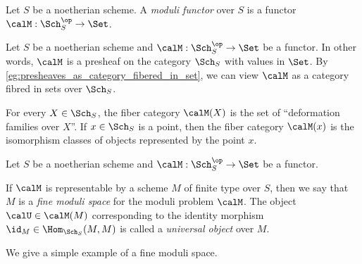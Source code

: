     \begin{definition}\label{def:moduli_functor}
        Let \(S\) be a noetherian scheme.
        A \emph{moduli functor} over \(S\) is a functor \(\calM: \Sch_{S}^{\op} \to \Set\).
    \end{definition}

    \begin{remark}\label{rmk:moduli_functor_as_presheaf_and_fibred_category}
        Let \(S\) be a noetherian scheme and \(\calM: \Sch_{S}^{\op} \to \Set\) be a functor.
        In other words, \(\calM\) is a presheaf on the category \(\Sch_{S}\) with values in \(\Set\).
        By \cref{eg:presheaves_as_category_fibered_in_set}, we can view \(\calM\) as a category  fibred in sets over \(\Sch_{S}\).

        For every \(X \in \Sch_{S}\), the fiber category \(\calM(X)\) is the set of ``deformation families over \(X\)''.
        If \(x \in \Sch_{S}\) is a point, then the fiber category \(\calM(x)\) is the isomorphism classes of objects represented by the point \(x\).
    \end{remark}



    \begin{definition}\label{def:fine_moduli_space}
        Let \(S\) be a noetherian scheme and \(\calM: \Sch_{S}^{\op} \to \Set\) be a functor.

        If \(\calM\) is representable by a scheme \(M\) of finite type over \(S\), then we say that \(M\) is a \emph{fine moduli space} for the moduli problem \(\calM\).
        The object \(\calU \in \calM(M)\) corresponding to the identity morphism \(\id_M \in \Hom_{\Sch_{S}}(M, M)\) is called a \emph{universal object} over \(M\).
    \end{definition}


    We give a simple example of a fine moduli space.

